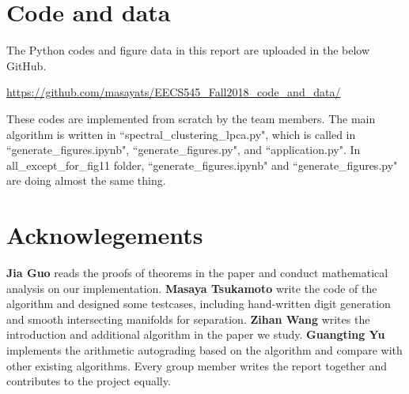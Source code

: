 \documentclass{article}
\begin{document}
\section{Code and data}                
The Python codes and figure data in this report are uploaded in the below GitHub.

\href{https://github.com/masayats/EECS545_Fall2018_code_and_data/}{\url{https://github.com/masayats/EECS545_Fall2018_code_and_data/}}

These codes are implemented from scratch by the team members.
The main algorithm is written in ``spectral\_clustering\_lpca.py", which is called in ``generate\_figures.ipynb", ``generate\_figures.py", and ``application.py". In all\_except\_for\_fig11 folder,  ``generate\_figures.ipynb" and  ``generate\_figures.py" are doing almost the same thing.


\section{Acknowlegements}
\textbf{Jia Guo} reads the proofs of theorems in the paper and conduct mathematical analysis on our implementation.
\textbf{Masaya Tsukamoto} write the code of the algorithm and designed some testcases, including hand-written digit generation and smooth intersecting manifolds for separation.
\textbf{Zihan Wang} writes the introduction and additional algorithm in the paper we study.
\textbf{Guangting Yu} implements the arithmetic autograding based on the algorithm and compare with other existing algorithms.
Every group member writes the report together and contributes to the project equally.

\medskip
\small

% 
% 


\end{document}
